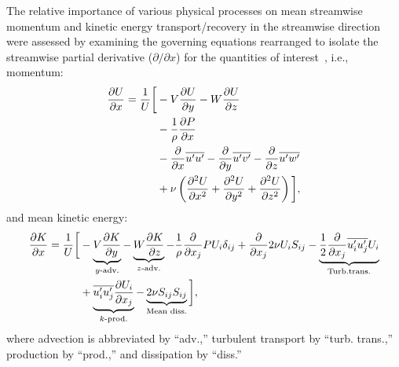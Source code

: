 The relative importance of various physical processes on mean streamwise
momentum and kinetic energy transport/recovery in the streamwise direction were
assessed by examining the governing equations rearranged to isolate the
streamwise partial derivative ($\partial / \partial x$) for the quantities of
interest~\cite{Bachant2015-JoT}, i.e., momentum:
\begin{equation}
\begin{split}
    \frac{\partial U}{\partial x} = 
    \frac{1}{U} \bigg{[}
    & - V\frac{\partial U}{\partial y}
    - W\frac{\partial U}{\partial z} \\
    & -\frac{1}{\rho}\frac{\partial P}{\partial x} \\
    & - \frac{\partial}{\partial x} \overline{u'u'}
    - \frac{\partial}{\partial y} \overline{u'v'}
    - \frac{\partial}{\partial z} \overline{u'w'} \\
    & + \nu\left(\frac{\partial^2 U}{\partial x^2}
    + \frac{\partial^2 U}{\partial y^2}
    + \frac{\partial^2 U}{\partial z^2} \right)
    \bigg{]},
\end{split}
\label{eq:momentum}
\end{equation}
and mean kinetic energy:
\begin{equation}
\begin{split}
    \frac{\p K}{\p x}
    =
    \frac{1}{U}
    \bigg{[}
    & - \underbrace{V \frac{\p K}{\p y}}_{y\text{-adv.%
        }}
        - \underbrace{W \frac{\p K}{\p z}}_{z\text{-adv.}}
        - \frac{1}{\rho}\frac{\p}{\p x_j} P U_i \delta_{ij}
        + \frac{\p}{\p x_j} 2 \nu U_i S_{ij} %
        - \underbrace{
            \frac{1}{2}\frac{\p}{\p x_j} \overline{u_i' u_j'} U_i
        }_{\text{Turb.%
            trans.%
        }} \\
        & + 
        \underbrace{
            \overline{u_i' u_j'} \frac{\p U_i}{\p x_j}
        }_{k\text{-prod.%
        }}
        - 
        \underbrace{
            2 \nu S_{ij}S_{ij}
        }_{\text{Mean diss.%
        }}
        \bigg{]},
        \label{eq:K-full}
    \end{split}
\end{equation}
where advection is abbreviated by ``adv.,'' turbulent transport by ``turb.
trans.,'' production by ``prod.,'' and dissipation by ``diss.''

